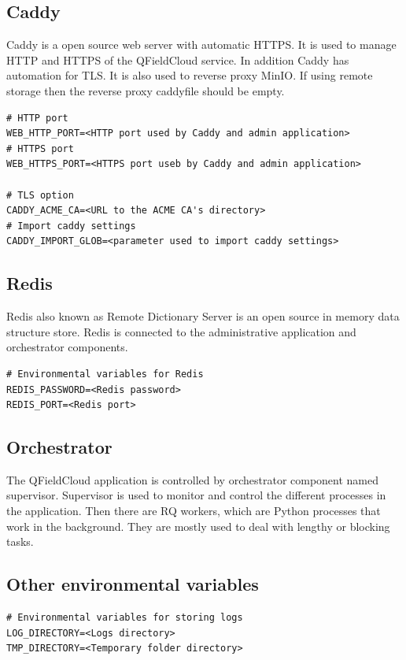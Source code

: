 \documentclass{article}
\begin{document}
\subsection{Caddy}
\begin{markdown}
Caddy is a open source web server with automatic HTTPS. It is used to manage HTTP and HTTPS of the QFieldCloud service. In addition Caddy has automation for TLS. It is also used to reverse proxy MinIO. If using remote storage then the reverse proxy caddyfile should be empty.
\end{markdown}
\begin{verbatim}
# HTTP port
WEB_HTTP_PORT=<HTTP port used by Caddy and admin application>
# HTTPS port
WEB_HTTPS_PORT=<HTTPS port useb by Caddy and admin application>

# TLS option
CADDY_ACME_CA=<URL to the ACME CA's directory>
# Import caddy settings
CADDY_IMPORT_GLOB=<parameter used to import caddy settings>
\end{verbatim}

\subsection{Redis}
\begin{markdown}
Redis also known as Remote Dictionary Server is an open source in memory data structure store. Redis is connected to the administrative application and orchestrator components.
\end{markdown}

\begin{verbatim}
# Environmental variables for Redis
REDIS_PASSWORD=<Redis password>
REDIS_PORT=<Redis port>
\end{verbatim}

\subsection{Orchestrator}
\begin{markdown}
The QFieldCloud application is controlled by orchestrator component named supervisor. Supervisor is used to monitor and control the different processes in the application. Then there are RQ workers, which are Python processes that work in the background. They are mostly used to deal with lengthy or blocking tasks.
\end{markdown}

\subsection{Other environmental variables}
\begin{verbatim}
# Environmental variables for storing logs
LOG_DIRECTORY=<Logs directory>
TMP_DIRECTORY=<Temporary folder directory>
\end{verbatim}
\end{document}
